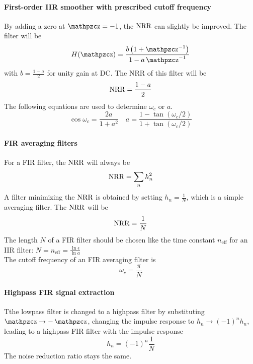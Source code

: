 \paragraph{First-order IIR smoother with prescribed cutoff frequency}
By adding a zero at $\z=-1$, the $\operatorname{\text{NRR}}$ can slightly be improved. 
The filter will be
\begin{equation*}
	H(\z) = \frac{b \left( 1 + \z^{-1} \right)}{1 - a \z^{-1}}
\end{equation*}
with $b = \frac{1-a}{2}$ for unity gain at DC. The NRR of this filter will be
\begin{equation*}
	\operatorname{\text{NRR}} = \frac{1-a}{2}
\end{equation*}
The following equations are used to determine $\omega_c$ or $a$.
\begin{equation*}
	\cos \omega_c = \frac{2 a}{1+a^2} \quad a = \frac{1-\tan(\omega_c/2)}{1+\tan(\omega_c/2)}
\end{equation*}

\paragraph{FIR averaging filters}
For a FIR filter, the $\operatorname{\text{NRR}}$ will always be
\begin{equation*}
	\operatorname{\text{NRR}} = \sum\limits_n h_n^2
\end{equation*}
A filter minimizing the $\operatorname{\text{NRR}}$ is obtained by setting $h_n = \frac{1}{N}$, which is a simple averaging filter. The $\operatorname{\text{NRR}}$ will be
\begin{equation*}
	\operatorname{\text{NRR}} = \frac{1}{N}
\end{equation*}
The length $N$ of a FIR filter should be chosen like the time constant
$n_{\text{eff}}$ for an IIR filter: 
$N = n_{\text{eff}} = \frac{\ln \epsilon}{\ln a}$ \\

The cutoff frequency of an FIR averaging filter is
\begin{equation*}
	\omega_c = \frac{\pi}{N}
\end{equation*}

\paragraph{Highpass FIR signal extraction}
Tthe lowpass filter is changed to a highpass filter by substituting $\z \to -\z$,
changing the impulse response to $h_n \to (-1)^n h_n$, leading to
a highpass FIR filter with the impulse response
\begin{equation*}
	h_n = (-1)^n \frac{1}{N}
\end{equation*}
The noise reduction ratio stays the same.

